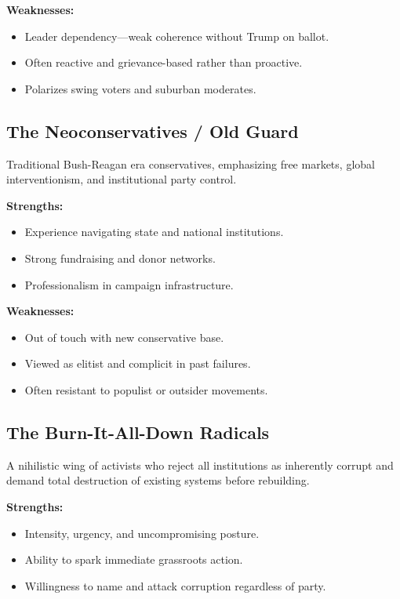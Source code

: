 \textbf{Weaknesses:}
\begin{itemize}
\item Leader dependency—weak coherence without Trump on ballot.
\item Often reactive and grievance-based rather than proactive.
\item Polarizes swing voters and suburban moderates.
\end{itemize}

\subsection{The Neoconservatives / Old Guard}
Traditional Bush-Reagan era conservatives, emphasizing free markets, global interventionism, and institutional party control.

\textbf{Strengths:}
\begin{itemize}
\item Experience navigating state and national institutions.
\item Strong fundraising and donor networks.
\item Professionalism in campaign infrastructure.
\end{itemize}

\textbf{Weaknesses:}
\begin{itemize}
\item Out of touch with new conservative base.
\item Viewed as elitist and complicit in past failures.
\item Often resistant to populist or outsider movements.
\end{itemize}

\subsection{The Burn-It-All-Down Radicals}
A nihilistic wing of activists who reject all institutions as inherently corrupt and demand total destruction of existing systems before rebuilding.

\textbf{Strengths:}
\begin{itemize}
\item Intensity, urgency, and uncompromising posture.
\item Ability to spark immediate grassroots action.
\item Willingness to name and attack corruption regardless of party.
\end{itemize}

